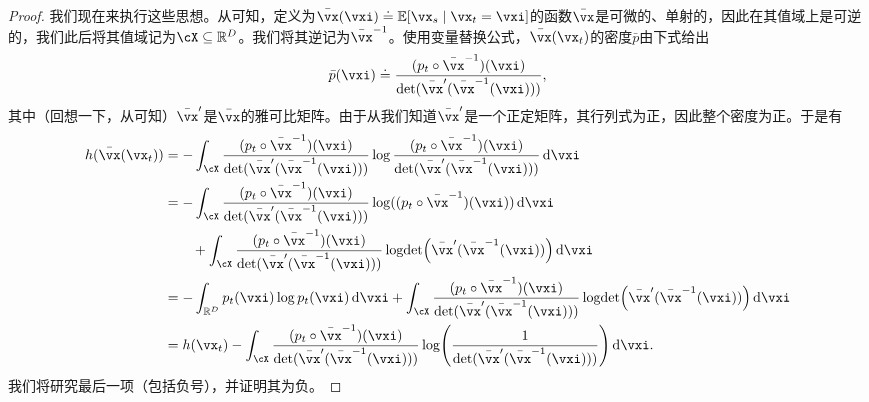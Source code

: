 \documentclass[../../book-main.tex]{subfiles}
\begin{document}
\begin{proof}
    我们现在来执行这些思想。从可知，定义为\(\bar{\vx}(\vxi) \doteq \Ex[\vx_{s} \given \vx_{t} = \vxi]\)的函数\(\bar{\vx}\)是可微的、单射的，因此在其值域上是可逆的，我们此后将其值域记为\(\cX \subseteq \R^{D}\)。我们将其逆记为\(\bar{\vx}^{-1}\)。使用变量替换公式，\(\bar{\vx}(\vx_{t})\)的密度\(\bar{p}\)由下式给出
    \begin{equation}
        \bar{p}(\vxi) \doteq \frac{(p_{t} \circ \bar{\vx}^{-1})(\vxi)}{\det(\bar{\vx}^{\prime}(\bar{\vx}^{-1}(\vxi)))},
    \end{equation}
    其中（回想一下，从可知）\(\bar{\vx}^{\prime}\)是\(\bar{\vx}\)的雅可比矩阵。由于从我们知道\(\bar{\vx}^{\prime}\)是一个正定矩阵，其行列式为正，因此整个密度为正。于是有
    \begin{align}
        h(\bar{\vx}(\vx_{t}))
        &= -\int_{\cX}\frac{(p_{t} \circ \bar{\vx}^{-1})(\vxi)}{\det(\bar{\vx}^{\prime}(\bar{\vx}^{-1}(\vxi)))} \log \frac{(p_{t} \circ \bar{\vx}^{-1})(\vxi)}{\det(\bar{\vx}^{\prime}(\bar{\vx}^{-1}(\vxi)))} \odif{\vxi} \\ 
        &= -\int_{\cX}\frac{(p_{t} \circ \bar{\vx}^{-1})(\vxi)}{\det(\bar{\vx}^{\prime}(\bar{\vx}^{-1}(\vxi)))} \log((p_{t} \circ \bar{\vx}^{-1})(\vxi))\odif{\vxi} \\ 
        &\qquad + \int_{\cX}\frac{(p_{t} \circ \bar{\vx}^{-1})(\vxi)}{\det(\bar{\vx}^{\prime}(\bar{\vx}^{-1}(\vxi)))}\logdet\rp{\bar{\vx}^{\prime}(\bar{\vx}^{-1}(\vxi))}\odif{\vxi} \\ 
        &= -\int_{\R^{D}}p_{t}(\vxi)\log p_{t}(\vxi)\odif{\vxi} + \int_{\cX}\frac{(p_{t} \circ \bar{\vx}^{-1})(\vxi)}{\det(\bar{\vx}^{\prime}(\bar{\vx}^{-1}(\vxi)))}\logdet\rp{\bar{\vx}^{\prime}(\bar{\vx}^{-1}(\vxi))}\odif{\vxi} \\ 
        &= h(\vx_{t}) - \int_{\cX}\frac{(p_{t} \circ \bar{\vx}^{-1})(\vxi)}{\det(\bar{\vx}^{\prime}(\bar{\vx}^{-1}(\vxi)))}\log\rp{\frac{1}{\det(\bar{\vx}^{\prime}(\bar{\vx}^{-1}(\vxi)))}}\odif{\vxi}.
    \end{align}
    我们将研究最后一项（包括负号），并证明其为负。


\end{proof}
\end{document}
